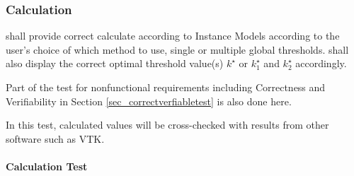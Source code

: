 \documentclass[12pt, titlepage]{article}
\begin{document}
\subsubsection{Calculation}
\label{sec_caltest} \progname{} shall provide correct calculate according to
Instance Models according to the user's choice of which method to use, single or
multiple global thresholds. \progname{} shall also display the correct optimal
threshold value(s) $k^{\star}$ or $k^{\star}_{1}$ and $k^{\star}_{2}$
accordingly.

Part of the test for nonfunctional requirements including Correctness and
Verifiability in Section \ref{sec_correctverfiabletest} is also done here.

In this test, calculated values will be cross-checked with results from other
software such as VTK.
		
\paragraph{Calculation Test}
\end{document}
